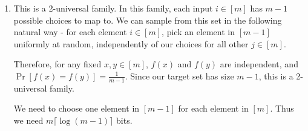 \documentclass{article}
\begin{document}
\begin{enumerate}[label=(\alph*)]
  \item This is a 2-universal family.
    In this family, each input $i \in [m]$ has $m-1$ possible choices to map
    to.  We can sample from this set in the following natural way - 
    for each element $i \in [m]$, pick an element in $[m-1]$ uniformly at
    random, independently of our choices for all other $j \in [m]$.

    Therefore, for any fixed $x,y \in [m]$, $f(x)$ and $f(y)$ are
    independent, and $\Pr[f(x) = f(y)] = \frac{1}{m-1}$. Since our target set
    has size $m-1$, this is a 2-universal family.

    We need to choose one element in $[m-1]$ for each element in $[m]$. Thus
    we need $m\lceil\log(m-1)\rceil$ bits.

\end{enumerate}
\end{document}
